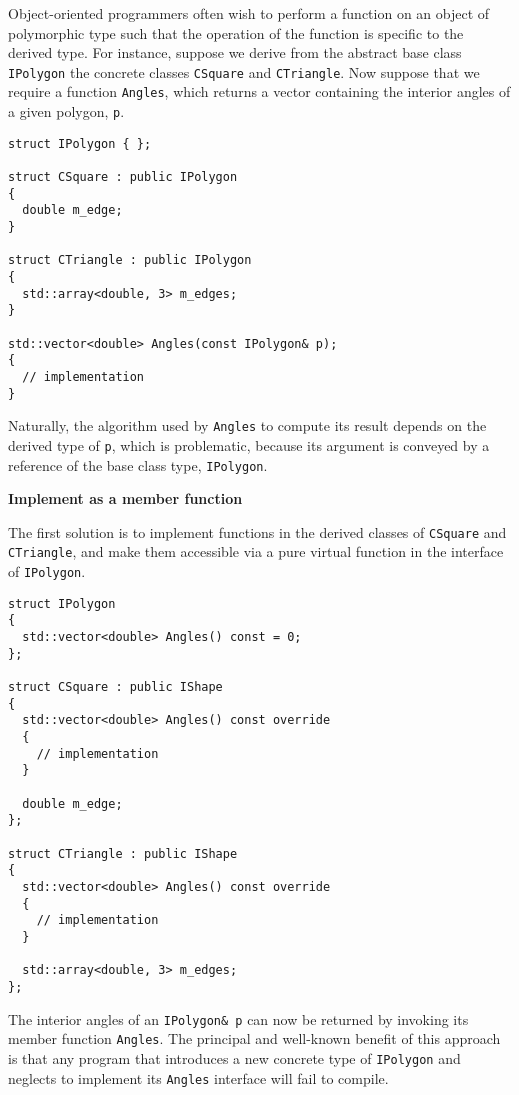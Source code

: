 \documentclass[10pt,a4paper,twocolumn]{article}
\renewcommand\section[1]{
    \begin{minipage}[c]{0.94\linewidth}
    \large \raggedright \sffamily \textbf{#1}
    \end{minipage}
}
\newcommand\mycode[1]{{\small\texttt{#1}}}
\begin{document}
Object-oriented programmers often wish to perform a function on an object of polymorphic type such that the operation of the function is specific to the derived type. For instance, suppose we derive from the abstract base class \mycode{IPolygon} the concrete classes \mycode{CSquare} and \mycode{CTriangle}. Now suppose that we require a function \mycode{Angles}, which returns a vector containing the interior angles of a given polygon, \mycode{p}.

{\small\begin{verbatim}
struct IPolygon { };

struct CSquare : public IPolygon
{
  double m_edge;
}

struct CTriangle : public IPolygon
{
  std::array<double, 3> m_edges;
}

std::vector<double> Angles(const IPolygon& p);
{
  // implementation
}
\end{verbatim}}

Naturally, the algorithm used by \mycode{Angles} to compute its result depends on the derived type of \mycode{p}, which is problematic, because its argument is conveyed by a reference of the base class type, \mycode{IPolygon}.


\section{Implement as a member function}

The first solution is to implement functions in the derived classes of \mycode{CSquare} and \mycode{CTriangle}, and make them accessible via a pure virtual function in the interface of \mycode{IPolygon}.

{\small\begin{verbatim}
struct IPolygon
{
  std::vector<double> Angles() const = 0;
};

struct CSquare : public IShape
{
  std::vector<double> Angles() const override
  {
    // implementation
  }

  double m_edge;
};

struct CTriangle : public IShape
{
  std::vector<double> Angles() const override
  {
    // implementation
  }

  std::array<double, 3> m_edges;
};
\end{verbatim}}

The interior angles of an \mycode{IPolygon\& p} can now be returned by invoking its member function \mycode{Angles}. The principal and well-known benefit of this approach is that any program that introduces a new concrete type of \mycode{IPolygon} and neglects to implement its \mycode{Angles} interface will fail to compile.
\end{document}
